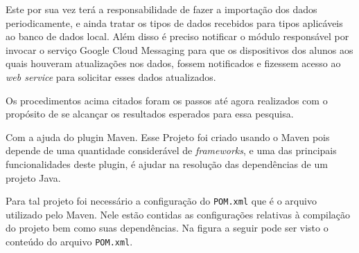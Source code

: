 	\par Este por sua vez terá a responsabilidade de fazer a importação dos dados
periodicamente, e ainda tratar os tipos de dados recebidos para tipos
aplicáveis ao banco de dados local. Além disso é preciso notificar o módulo
responsável por invocar o serviço Google Cloud Messaging para que os
dispositivos dos alunos aos quais houveram atualizações nos dados, fossem
notificados e fizessem acesso ao \textit{web service} para solicitar esses
dados atualizados.

	\par Os procedimentos acima citados foram os passos até agora realizados com o
propósito de se alcançar os resultados esperados para essa pesquisa.



\par Com a ajuda do plugin Maven. Esse Projeto foi criado usando o
Maven pois depende de uma quantidade considerável de \textit{frameworks}, e uma das
principais funcionalidades deste plugin, é ajudar na resolução das dependências
de um projeto Java.

	\par Para tal projeto foi necessário a configuração do \texttt{POM.xml} que é o
arquivo utilizado pelo Maven. Nele estão contidas as configurações
relativas à compilação do projeto bem como suas dependências.  Na figura
 a seguir pode ser visto o conteúdo do arquivo
\texttt{POM.xml}.






